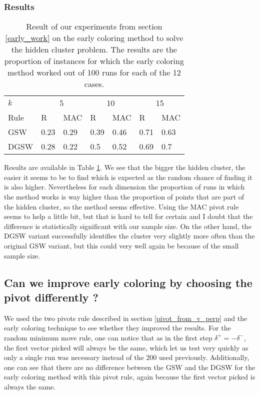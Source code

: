 \documentclass[12pt]{article}
\begin{document}
\subsubsection{Results}
\begin{table}[h!]
\centering
\caption{Result of our experiments from section \ref{early_work} on the early coloring method to solve the hidden cluster problem. The results are the proportion of instances for which the early coloring method worked out of 100 runs for each of the 12 cases.}
\begin{tabular}{l|ll|ll|ll}
$k$  & \multicolumn{2}{c}{5} & \multicolumn{2}{c}{10} & \multicolumn{2}{c}{15}\\
Rule &R&MAC&R&MAC&R&MAC\\ \hline
GSW  &0.23&0.29&0.39&0.46&0.71&0.63\\
DGSW &0.28&0.22&0.5&0.52&0.69&0.7\\
\end{tabular}
\label{early_coloring_method_exp1}
\end{table}
Results are available in Table \ref{early_coloring_method_exp1}. We see that the bigger the hidden cluster, the easier it seems to be to find which is expected as the random chance of finding it is also higher. Nevertheless for each dimension the proportion of runs in which the method works is way higher than the proportion of points that are part of the hidden cluster, so the method seems effective. Using the MAC pivot rule seems to help a little bit, but that is hard to tell for certain and I doubt that the difference is statistically significant with our sample size. On the other hand, the DGSW variant successfully identifies the cluster very slightly more often than the original GSW variant, but this could very well again be because of the small sample size.

\subsection{Can we improve early coloring by choosing the pivot differently ?}\label{new_rule_tests}
We used the two pivots rule described in section \ref{pivot_from_v_perp} and the early coloring technique to see whether they improved the results. For the random minimum move rule, one can notice that as in the first step $\delta^+=-\delta^-$, the first vector picked will always be the same, which let us test very quickly as only a single run was necessary instead of the 200 used previously. Additionally, one can see that there are no difference between the GSW and the DGSW for the early coloring method with this pivot rule, again because the first vector picked is always the same.
\end{document}
